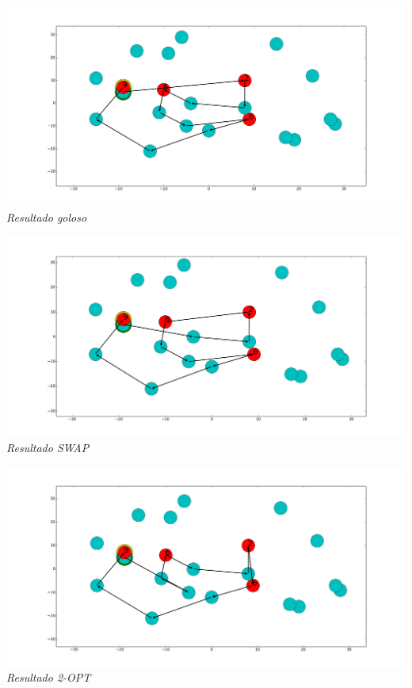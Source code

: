 \vspace*{0.3cm} \vspace*{0.3cm}
  \begin{center}
\includegraphics[scale=0.3]{./EJ5/caminoEjGoloso.png}
\\{\textit{Resultado goloso}}
  \end{center}
  \vspace*{0.3cm}
  
  \vspace*{0.3cm} \vspace*{0.3cm}
  \begin{center}
\includegraphics[scale=0.3]{./EJ5/caminoEjswap.png}
\\{\textit{Resultado SWAP}}
  \end{center}
  \vspace*{0.3cm}

  \vspace*{0.3cm} \vspace*{0.3cm}
  \begin{center}
\includegraphics[scale=0.3]{./EJ5/caminoEj2opt.png}
\\{\textit{Resultado 2-OPT}}
  \end{center}
  \vspace*{0.3cm}
  
